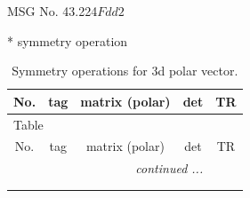 \documentclass[fleqn,8pt]{jsarticle}
\begin{document}
\setcounter{MaxMatrixCols}{32}

\renewcommand{\tablename}{Table~}
\renewcommand{\figurename}{Figure~}
\begin{center}
\LARGE
MSG No. 43.224\quad$Fdd2$
\end{center}
* symmetry operation
\renewcommand{\arraystretch}{1.3}
\begin{longtable}{ccccc}
\caption{Symmetry operations for 3d polar vector.}
 \\
 \hline \hline
No. & tag & matrix (polar) & det & TR \\ \hline \endfirsthead

\multicolumn{4}{l}{\tablename\ \thetable{}} \\
 \hline \hline
No. & tag & matrix (polar) & det & TR \\ \hline \endhead

 \hline \hline
\multicolumn{4}{r}{\footnotesize\it continued ...} \\ \endfoot

 \hline \hline
\multicolumn{4}{r}{} \\ \endlastfoot


\end{longtable}
\end{document}

